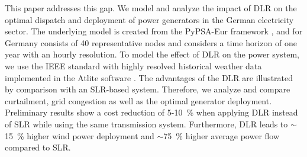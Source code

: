 \documentclass[
10pt, %
a4paper, %
oneside, %
headinclude,footinclude, %
BCOR5mm, %
left=1.5in,right=1in,top=1in,bottom=1in,
]{scrartcl}
\begin{document}
This paper addresses this gap. We model and analyze the impact of DLR on the optimal dispatch and deployment of power generators in the German electricity sector.
The underlying model is created from the PyPSA-Eur framework \cite{horschPyPSAEurOpenOptimisation2018}, and for Germany consists of 40 representative nodes and considers a time horizon of one year with an hourly resolution. To model the effect of DLR on the power system, we use the IEEE standard \cite{IEEEStandardCalculating2012} with highly resolved historical weather data implemented in the Atlite software \cite{hofmannAtliteLightweightPython2021}. The advantages of the DLR are illustrated by comparison with an SLR-based system. Therefore, we analyze and compare curtailment, grid congestion as well as the optimal generator deployment. Preliminary results show a cost reduction of 5-10~\% when applying DLR instead of SLR while using the same transmission system. Furthermore, DLR leads to $\sim$15~\% higher wind power deployment and $\sim$75~\% higher average power flow compared to SLR.






\newpage

\renewcommand{\refname}{\spacedlowsmallcaps{References}} %

\thispagestyle{empty}
\printbibliography %
\thispagestyle{empty}
\end{document}
